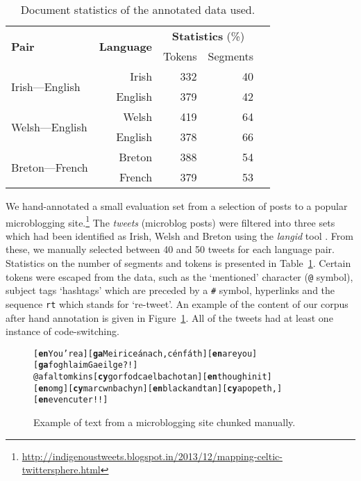 \documentclass[11pt]{article}
\begin{document}
\begin{table}
\vspace{-0.65cm}
\begin{center}
\begin{tabular}{|l|r|r|r|r}
\hline
\multirow{2}{*}{\textbf{Pair}} & \multirow{2}{*}{\textbf{Language}}  & \multicolumn{2}{c|}{\textbf{Statistics} (\%)} \\\cline{3-4}
                &  &  Tokens & Segments \\
\hline
\multirow{2}{*}{Irish---English} & Irish & 332 & 40 \\
                                 & English & 379 & 42 \\
\hline
\multirow{2}{*}{Welsh---English} & Welsh & 419 & 64 \\
                                 & English & 378 & 66  \\
\hline
\multirow{2}{*}{Breton---French} & Breton & 388 & 54 \\
                                 & French & 379 & 53  \\
\hline
\end{tabular}
\end{center}
\caption{Document statistics of the annotated data used. }
\label{table:datastats}
\end{table}

We hand-annotated a small evaluation set from a selection of posts to a popular microblogging site.\footnote{\url{http://indigenoustweets.blogspot.in/2013/12/mapping-celtic-twittersphere.html}} The \emph{tweets} (microblog posts) were filtered into three sets which had been identified as Irish, Welsh and Breton using the \emph{langid} tool \cite{lui2012langid}. From these, we manually selected between 40 and 50 tweets for each language pair. Statistics on the number of segments and tokens is presented in Table~\ref{table:datastats}.
Certain tokens were escaped from the data, such as the `mentioned' character (\texttt{@} symbol), subject tags `hashtags' which are preceded by a \texttt{\#} symbol, hyperlinks and the sequence \texttt{rt} which stands for `re-tweet'. An example of the content of our corpus after hand annotation is given in Figure~\ref{fig:tweets}. All of the tweets had at least one instance of code-switching.

\begin{figure}
\begin{small}
\begin{alltt}
[\textbf{en} You're a] [\textbf{ga} Meirice\'{a}nach, c\'{e}n f\'{a}th] [\textbf{en} are you] [\textbf{ga} foghlaim Gaeilge?!] 
@afaltomkins [\textbf{cy} gorfod cael bach o tan] [\textbf{en} though init] 
[\textbf{en} omg] [\textbf{cy} mar cwn bach yn] [\textbf{en} black and tan] [\textbf{cy} a popeth,] [\textbf{en} even cuter!!] 
\end{alltt}
\end{small}
\vspace{-0.3cm}
\caption{Example of text from a microblogging site chunked manually.}
\label{fig:tweets}
\end{figure}
\end{document}

